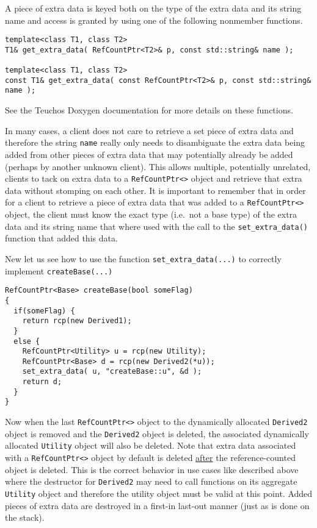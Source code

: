 A piece of extra data is keyed both on the type of the extra data and
its string name and access is granted by using one of the following
nonmember functions.

{\scriptsize\begin{verbatim}
template<class T1, class T2>
T1& get_extra_data( RefCountPtr<T2>& p, const std::string& name );

template<class T1, class T2>
const T1& get_extra_data( const RefCountPtr<T2>& p, const std::string& name );
\end{verbatim}}

{}\noindent{} See the Teuchos Doxygen documentation for more details
on these functions.

In many cases, a client does not care to retrieve a set piece of extra
data and therefore the string \texttt{name} really only needs to
disambiguate the extra data being added from other pieces of extra
data that may potentially already be added (perhaps by another unknown
client).  This allows multiple, potentially unrelated, clients to tack
on extra data to a {}\texttt{Ref\-Count\-Ptr<>} object and retrieve
that extra data without stomping on each other.  It is important to
remember that in order for a client to retrieve a piece of extra data
that was added to a {}\texttt{Ref\-Count\-Ptr<>} object, the client
must know the exact type (i.e.~not a base type) of the extra data and
its string name that where used with the call to the
{}\texttt{set\-\_extra\-\_data()} function that added this data.

New let us see how to use the function {}\texttt{set\-\_extra\-\_data(...)}
to correctly implement {}\texttt{create\-Base(...)}

{\scriptsize\begin{verbatim}
RefCountPtr<Base> createBase(bool someFlag)
{
  if(someFlag) {
    return rcp(new Derived1);
  }
  else {
    RefCountPtr<Utility> u = rcp(new Utility);
    RefCountPtr<Base> d = rcp(new Derived2(*u));
    set_extra_data( u, "createBase::u", &d );
    return d;
  }
}
\end{verbatim}}

{}\noindent{}Now when the last {}\texttt{Ref\-Count\-Ptr<>} object to
the dynamically allocated {}\texttt{Derived2} object is removed and
the {}\texttt{Derived2} object is deleted, the associated dynamically
allocated {}\texttt{Utility} object will also be deleted.  Note that
extra data associated with a {}\texttt{Ref\-Count\-Ptr<>} object by
default is deleted \underline{after} the reference-counted object is
deleted.  This is the correct behavior in use cases like described
above where the destructor for {}\texttt{Derived2} may need to call
functions on its aggregate {}\texttt{Utility} object and therefore the
utility object must be valid at this point.  Added pieces of extra
data are destroyed in a first-in last-out manner (just as is done on
the stack).

